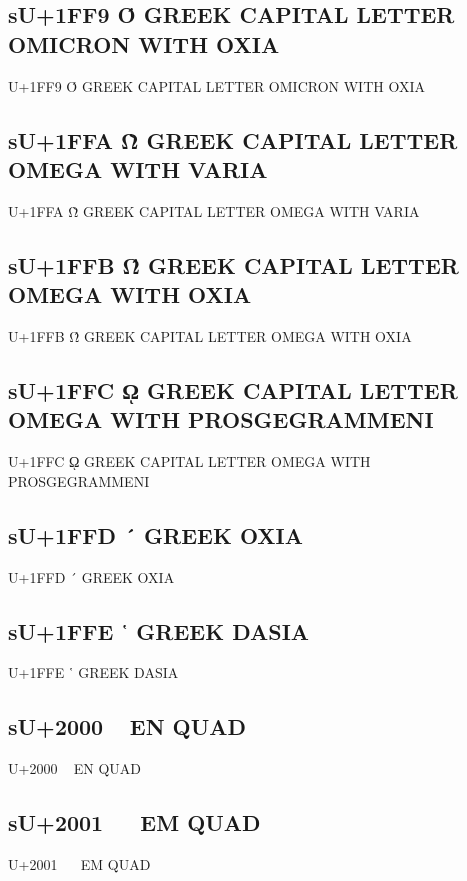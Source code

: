\subsection{sU+1FF9 Ό GREEK CAPITAL LETTER OMICRON WITH OXIA}

U+1FF9 Ό GREEK CAPITAL LETTER OMICRON WITH OXIA

\subsection{sU+1FFA Ὼ GREEK CAPITAL LETTER OMEGA WITH VARIA}

U+1FFA Ὼ GREEK CAPITAL LETTER OMEGA WITH VARIA

\subsection{sU+1FFB Ώ GREEK CAPITAL LETTER OMEGA WITH OXIA}

U+1FFB Ώ GREEK CAPITAL LETTER OMEGA WITH OXIA

\subsection{sU+1FFC ῼ GREEK CAPITAL LETTER OMEGA WITH PROSGEGRAMMENI}

U+1FFC ῼ GREEK CAPITAL LETTER OMEGA WITH PROSGEGRAMMENI

\subsection{sU+1FFD ´ GREEK OXIA}

U+1FFD ´ GREEK OXIA

\subsection{sU+1FFE ῾ GREEK DASIA}

U+1FFE ῾ GREEK DASIA

\fi

\subsection{sU+2000   EN QUAD}

U+2000   EN QUAD

\subsection{sU+2001   EM QUAD}

U+2001   EM QUAD

